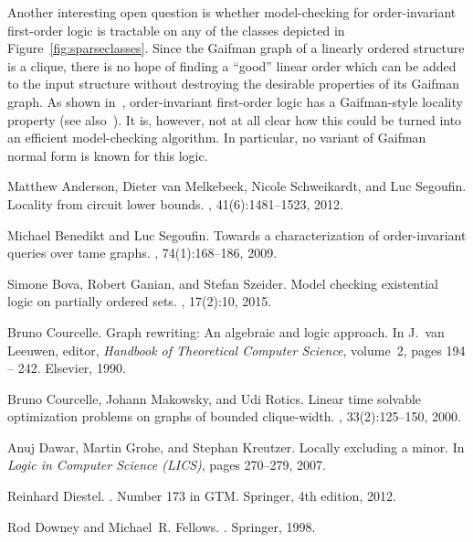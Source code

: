 \documentclass[12pt]{amsart}
\begin{document}
Another interesting open question is whether model-checking for
order-invariant first-order logic is tractable on any of the classes
depicted in Figure~\ref{fig:sparseclasses}. Since the Gaifman graph of
a linearly ordered structure is a clique, there is no hope of finding
a ``good'' linear order which can be added to the input structure
without destroying the desirable properties of its Gaifman graph. As
shown in~\cite{GroheS00}, order-invariant first-order logic has a
Gaifman-style locality property (see also~\cite{AndersonMSS12}). It
is, however, not at all clear how this could be turned into an
efficient model-checking algorithm. In particular, no variant of
Gaifman normal form is known for this logic.

\begin{thebibliography}{10}

Matthew Anderson, Dieter van Melkebeek, Nicole Schweikardt, and Luc Segoufin.
\newblock Locality from circuit lower bounds.
, 41(6):1481--1523, 2012.

Michael Benedikt and Luc Segoufin.
\newblock Towards a characterization of order-invariant queries over tame
  graphs.
, 74(1):168--186, 2009.

Simone Bova, Robert Ganian, and Stefan Szeider.
\newblock Model checking existential logic on partially ordered sets.
, 17(2):10, 2015.

Bruno Courcelle.
\newblock Graph rewriting: An algebraic and logic approach.
\newblock In J.~{van Leeuwen}, editor, {\em Handbook of Theoretical Computer
  Science}, volume~2, pages 194 -- 242. Elsevier, 1990.

Bruno Courcelle, Johann Makowsky, and Udi Rotics.
\newblock Linear time solvable optimization problems on graphs of bounded
  clique-width.
, 33(2):125--150, 2000.

Anuj Dawar, Martin Grohe, and Stephan Kreutzer.
\newblock Locally excluding a minor.
\newblock In {\em Logic in Computer Science (LICS)}, pages 270--279, 2007.

Reinhard Diestel.
.
\newblock Number 173 in GTM. Springer, 4th edition, 2012.

Rod Downey and Michael~R. Fellows.
.
\newblock Springer, 1998.


\end{thebibliography}
\end{document}
